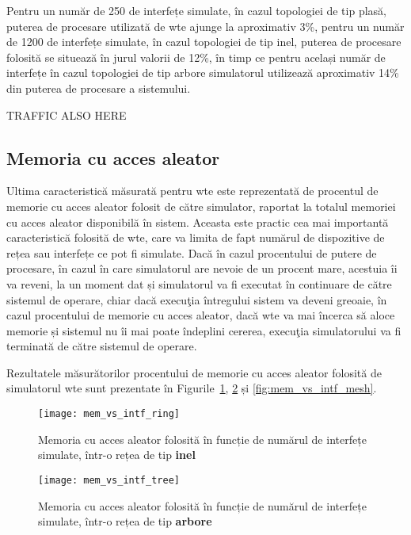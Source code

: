 Pentru un număr de 250 de interfețe simulate, în cazul topologiei de tip plasă, puterea de procesare utilizată de \gls{wte} ajunge la aproximativ 3\%, pentru un număr de 1200 de interfețe simulate, în cazul topologiei de tip inel, puterea de procesare folosită se situează în jurul valorii de 12\%, în timp ce pentru același număr de interfețe în cazul topologiei de tip arbore simulatorul utilizează aproximativ 14\% din puterea de procesare a sistemului.

TRAFFIC ALSO HERE

\subsection{Memoria cu acces aleator}

Ultima caracteristică măsurată pentru \gls{wte} este reprezentată de procentul de memorie cu acces aleator folosit de către simulator, raportat la totalul memoriei cu acces aleator disponibilă în sistem. Aceasta este practic cea mai importantă caracteristică folosită de \gls{wte}, care va limita de fapt numărul de dispozitive de rețea sau interfețe ce pot fi simulate. Dacă în cazul procentului de putere de procesare, în cazul în care simulatorul are nevoie de un procent mare, acestuia îi va reveni, la un moment dat și simulatorul va fi executat în continuare de către sistemul de operare, chiar dacă execuţia întregului sistem va deveni greoaie, în cazul procentului de memorie cu acces aleator, dacă \gls{wte} va mai încerca să aloce memorie și sistemul nu îi mai poate îndeplini cererea, execuţia simulatorului va fi terminată de către sistemul de operare.

Rezultatele măsurătorilor procentului de memorie cu acces aleator folosită de simulatorul \gls{wte} sunt prezentate în Figurile~\ref{fig:mem_vs_intf_ring}, \ref{fig:mem_vs_intf_tree} și \ref{fig:mem_vs_intf_mesh}.

\begin{figure}[hp]
	\centering
	\texttt{[image: mem\_vs\_intf\_ring]}
	\caption{Memoria cu acces aleator folosită în funcție de numărul de interfețe simulate, într-o rețea de tip \textbf{inel}}
	\label{fig:mem_vs_intf_ring}
\end{figure}

\begin{figure}[hp]
	\centering
	\texttt{[image: mem\_vs\_intf\_tree]}
	\caption{Memoria cu acces aleator folosită în funcție de numărul de interfețe simulate, într-o rețea de tip \textbf{arbore}}
	\label{fig:mem_vs_intf_tree}
\end{figure}

